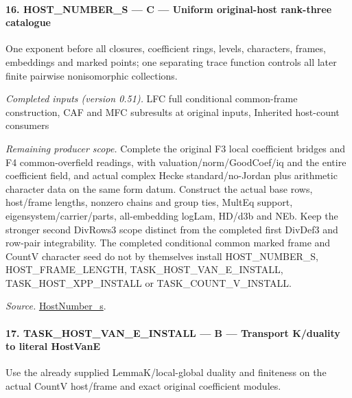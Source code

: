 \documentclass[11pt,a4paper]{article}
\numberwithin{equation}{section}
\theoremstyle{remark}\newtheorem{remark}[theorem]{Remark}
\begin{document}
\paragraph{16. HOST\_\allowbreak NUMBER\_\allowbreak S — C — Uniform original-host rank-three catalogue}

One exponent before all closures, coefficient rings, levels, characters, frames, embeddings and marked points; one separating trace function controls all later finite pairwise nonisomorphic collections.

\emph{Completed inputs (version 0.51).} LFC full conditional common-frame construction, CAF and MFC subresults at original inputs, Inherited host-count consumers

\emph{Remaining producer scope.} Complete the original F3 local coefficient bridges and F4 common-overfield readings, with valuation/norm/GoodCoef/iq and the entire coefficient field, and actual complex Hecke standard/no-Jordan plus arithmetic character data on the same form datum. Construct the actual base rows, host/frame lengths, nonzero chains and group ties, MultEq support, eigensystem/carrier/parts, all-embedding logLam, HD/d3b and NEb. Keep the stronger second DivRows3 scope distinct from the completed first DivDef3 and row-pair integrability. The completed conditional common marked frame and CountV character seed do not by themselves install HOST\_\allowbreak NUMBER\_\allowbreak S, HOST\_\allowbreak FRAME\_\allowbreak LENGTH, TASK\_\allowbreak HOST\_\allowbreak VAN\_\allowbreak E\_\allowbreak INSTALL, TASK\_\allowbreak HOST\_\allowbreak XPP\_\allowbreak INSTALL or TASK\_\allowbreak COUNT\_\allowbreak V\_\allowbreak INSTALL.

\emph{Source.} \href{https://github.com/CocoSgt/riemann-hypothesis-lean/blob/7cbf7a0c32fca1badf05931879a37c3f8a2b03b4/src/Development/AutomorphicArithmetic/AutomorphicVarieties/ModularityArgument/ThresholdArguments/DenseThresholdCases/HostNumberS.lean#L18-L28}{HostNumber\_\allowbreak s}.



\paragraph{17. TASK\_\allowbreak HOST\_\allowbreak VAN\_\allowbreak E\_\allowbreak INSTALL — B — Transport K/duality to literal HostVanE}

Use the already supplied LemmaK/local-global duality and finiteness on the actual CountV host/frame and exact original coefficient modules.
\end{document}
